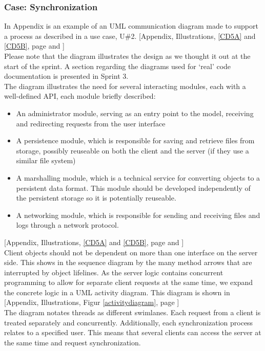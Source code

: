 \subsubsection{Case: Synchronization}
In Appendix is an example of an UML communication diagram made to support a process as described in a use case, U\#2.
[Appendix, Illustrations, \ref{CD5A} and \ref{CD5B}, page \pageref{CD5A} and \pageref{CD5B}]\\
Please note that the diagram illustrates the design as we thought it out at the start of the sprint. A section regarding the diagrams used for ‘real' code documentation is presented in Sprint 3. \\
The diagram illustrates the need for several interacting modules, each with a well-defined API, each module briefly described:\\
\begin{itemize}
\item An administrator module, serving as an entry point to the model, receiving and redirecting requests from the user interface
\item A persistence module, which is responsible for saving and retrieve files from storage, possibly reuseable on both the client and the server (if they use a similar file system)
\item A marshalling module, which is a technical service for converting objects to a persistent data format. This module should be developed
independently of the persistent storage so it is potentially reuseable. 
\item A networking module, which is responsible for sending and receiving files and logs through a network protocol.
\end{itemize}
[Appendix, Illustrations, \ref{CD5A} and \ref{CD5B}, page \pageref{CD5A} and \pageref{CD5B}]\\
\newline
Client objects should not be dependent on more than one interface on the server side. This shows in the sequence diagram by the many method arrows that are interrupted by object lifelines. As the server logic contains concurrent programming to allow for separate client requests at the same time, we expand the concrete logic in a UML activity diagram. This diagram is shown in [Appendix, Illustrations, Figur \ref{activitydiagram}, page \pageref{activitydiagram}]\\
\newline
The diagram notates threads as different swimlanes. Each request from a client is treated separately and concurrently. Additionally, each synchronization process relates to a specified user. This means that several clients can access the server at the same time and request synchronization.\\
